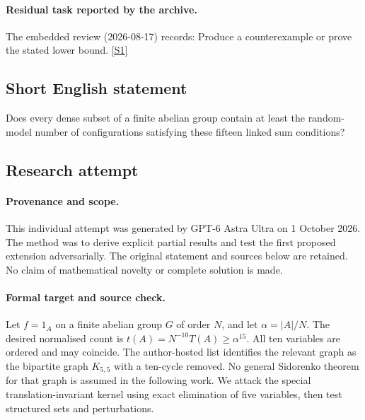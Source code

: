 \documentclass[11pt,a4paper]{article}
\newcommand{\sref}[2]{\hyperlink{source:#1:#2}{[S#2]}}
\begin{document}
\paragraph{Residual task reported by the archive.}

The embedded review (2026-08-17) records: Produce a counterexample or prove the stated lower bound. \sref{statement}{1}

\subsection{Short English statement}

Does every dense subset of a finite abelian group contain at least the random-model number of configurations satisfying these fifteen linked sum conditions?

\subsection{Research attempt}

\paragraph{Provenance and scope.}
This individual attempt was generated by GPT-6 Astra Ultra on 1 October 2026. The method was to derive explicit partial results and test the first proposed extension adversarially. The original statement and sources below are retained. No claim of mathematical novelty or complete solution is made.

\paragraph{Formal target and source check.}
Let $f=1_A$ on a finite abelian group $G$ of order $N$, and let $\alpha=|A|/N$. The desired normalised count is $t(A)=N^{-10}T(A)\geq\alpha^{15}$. All ten variables are ordered and may coincide. The author-hosted list identifies the relevant graph as the bipartite graph $K_{5,5}$ with a ten-cycle removed. No general Sidorenko theorem for that graph is assumed in the following work. We attack the special translation-invariant kernel using exact elimination of five variables, then test structured sets and perturbations.
\end{document}
